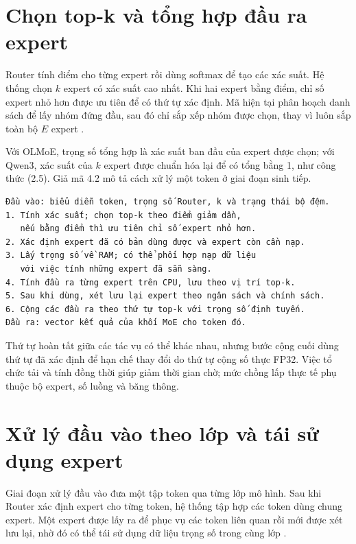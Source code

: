 \section{Chọn top-k và tổng hợp đầu ra expert}

Router tính điểm cho từng expert rồi dùng softmax để tạo các xác suất. Hệ thống chọn $k$ expert có xác suất cao nhất. Khi hai expert bằng điểm, chỉ số expert nhỏ hơn được ưu tiên để có thứ tự xác định. Mã hiện tại phân hoạch danh sách để lấy nhóm đứng đầu, sau đó chỉ sắp xếp nhóm được chọn, thay vì luôn sắp toàn bộ $E$ expert \cite{moe_tierengine_arch}.

Với OLMoE, trọng số tổng hợp là xác suất ban đầu của expert được chọn; với Qwen3, xác suất của $k$ expert được chuẩn hóa lại để có tổng bằng 1, như công thức (2.5). Giả mã 4.2 mô tả cách xử lý một token ở giai đoạn sinh tiếp.

\begin{Verbatim}[samepage=true,breaklines=true,breakanywhere=true,fontsize=\small,frame=single,framesep=3mm]
Đầu vào: biểu diễn token, trọng số Router, k và trạng thái bộ đệm.
1. Tính xác suất; chọn top-k theo điểm giảm dần,
   nếu bằng điểm thì ưu tiên chỉ số expert nhỏ hơn.
2. Xác định expert đã có bản dùng được và expert còn cần nạp.
3. Lấy trọng số về RAM; có thể phối hợp nạp dữ liệu
   với việc tính những expert đã sẵn sàng.
4. Tính đầu ra từng expert trên CPU, lưu theo vị trí top-k.
5. Sau khi dùng, xét lưu lại expert theo ngân sách và chính sách.
6. Cộng các đầu ra theo thứ tự top-k với trọng số định tuyến.
Đầu ra: vector kết quả của khối MoE cho token đó.
\end{Verbatim}

Thứ tự hoàn tất giữa các tác vụ có thể khác nhau, nhưng bước cộng cuối dùng thứ tự đã xác định để hạn chế thay đổi do thứ tự cộng số thực FP32. Việc tổ chức tải và tính đồng thời giúp giảm thời gian chờ; mức chồng lấp thực tế phụ thuộc bộ expert, số luồng và băng thông.

\section{Xử lý đầu vào theo lớp và tái sử dụng expert}

Giai đoạn xử lý đầu vào đưa một tập token qua từng lớp mô hình. Sau khi Router xác định expert cho từng token, hệ thống tập hợp các token dùng chung expert. Một expert được lấy ra để phục vụ các token liên quan rồi mới được xét lưu lại, nhờ đó có thể tái sử dụng dữ liệu trọng số trong cùng lớp \cite{moe_tierengine_arch}.

